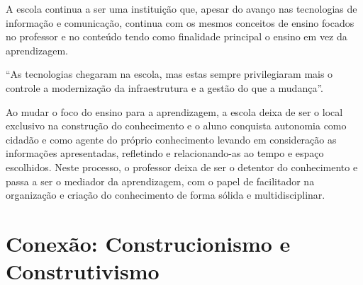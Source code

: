 \documentclass[12pt, openright, a4paper, brazil, english, french, spanish, bibjustif, openany, oneside]{abntex2}
\begin{document}
A escola continua a ser uma instituição que, apesar do avanço nas tecnologias de informação e comunicação, continua com os mesmos conceitos de ensino focados no professor e no conteúdo tendo como finalidade principal o ensino em vez da aprendizagem. 

\begin{citacao}

``As tecnologias chegaram na escola, mas estas sempre privilegiaram mais o controle a modernização da infraestrutura e a gestão do que a mudança''\cite{moran}.

\end{citacao}

Ao mudar o foco do ensino para a aprendizagem, a escola deixa de ser o local exclusivo na construção do conhecimento e o aluno conquista autonomia como cidadão e como agente do próprio conhecimento levando em consideração as informações apresentadas, refletindo e relacionando-as ao tempo e espaço escolhidos. Neste processo, o professor deixa de ser o detentor do conhecimento e passa a ser o mediador da aprendizagem, com o papel de facilitador na organização e criação do conhecimento de forma sólida e multidisciplinar. 

\newpage

\section{Conexão: Construcionismo e Construtivismo}


\end{document}
